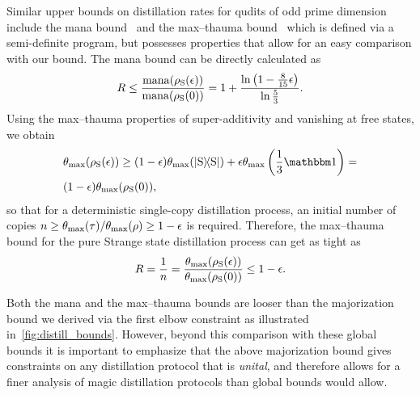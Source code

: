 \documentclass[pra,
aps,
twocolumn,
superscriptaddress,
groupedaddress,
nofootinbib,
reprint
]{revtex4-1}
\begin{document}
Similar upper bounds on distillation rates for qudits of odd prime dimension include the mana bound~\cite{cit:veitch} and the max--thauma bound~\cite{Wang_2020} which is defined via a semi-definite program, but possesses properties that allow for an easy comparison with our bound.
The mana bound can be directly calculated as
\begin{equation}
	R \leq \frac{{{\rm{mana}}(\rho_{\rm{S}}(\epsilon))}}{{{\rm{mana}}(\rho_{\rm{S}}(0))}} = 1 + \frac{\ln \left(1 - \frac{8}{15}\epsilon \right)}{\ln \frac{5}{3}}.
\end{equation}
Using the max--thauma properties of super-additivity and vanishing at free states, we obtain
\begin{align}
	&\theta_{\rm{max}}(\rho_{\rm{S}}(\epsilon)) \geq (1-\epsilon) \theta_{\rm{max}}(\ketbra{\rm{S}}) + \epsilon \theta_{\rm{max}}\left(\frac{1}{3}\id \right) = \nonumber\\
	&(1-\epsilon) \theta_{\rm{max}}(\rho_{\rm{S}}(0)),
\end{align}
so that for a deterministic single-copy distillation process, an initial number of copies $n \geq \theta_{\rm{max}}(\tau) / \theta_{\rm{max}}(\rho) \geq 1-\epsilon$ is required.
Therefore, the max--thauma bound for the pure Strange state distillation process can get as tight as
\begin{equation}
	R = \frac{1}{n} = \frac{\theta_{\rm{max}}(\rho_{\rm{S}}(\epsilon))}{\theta_{\rm{max}}(\rho_{\rm{S}}(0))} \leq 1-\epsilon.
\end{equation}

Both the mana and the max--thauma bounds are looser than the majorization bound we derived via the first elbow constraint as illustrated in~\cref{fig:distill_bounds}. However, beyond this comparison with these global bounds it is important to emphasize that the above majorization bound gives constraints on any distillation protocol that is \emph{unital}, and therefore allows for a finer analysis of magic distillation protocols than global bounds would allow. 
\end{document}
